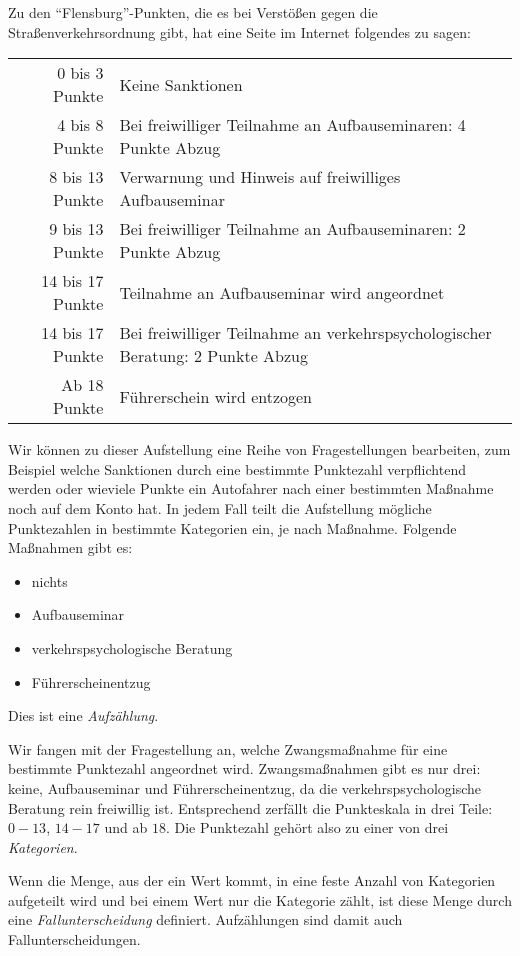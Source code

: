 Zu den "`Flensburg"'-Punkten, die es bei Verstößen gegen die
Straßenverkehrsordnung gibt, hat eine Seite im Internet folgendes zu
sagen:
%
\begin{center}
  \begin{tabular}{rl}
    0 bis 3 Punkte& Keine Sanktionen\\
    4 bis 8 Punkte& Bei freiwilliger Teilnahme an Aufbauseminaren: 4 Punkte Abzug\\
    8 bis 13 Punkte& Verwarnung und Hinweis auf freiwilliges Aufbauseminar\\
    9 bis 13 Punkte& Bei freiwilliger Teilnahme an Aufbauseminaren: 2 Punkte Abzug\\
    14 bis 17 Punkte& Teilnahme an Aufbauseminar wird angeordnet\\
    14 bis 17 Punkte&
                      Bei freiwilliger Teilnahme an verkehrspsychologischer Beratung: 2 Punkte Abzug\\
    Ab 18 Punkte&
                  Führerschein wird entzogen
  \end{tabular}
\end{center}
%
Wir können zu dieser Aufstellung eine Reihe von Fragestellungen
bearbeiten, zum Beispiel welche Sanktionen durch eine bestimmte
Punktezahl verpflichtend werden oder wieviele Punkte ein Autofahrer
nach einer bestimmten Maßnahme noch auf dem Konto hat.  In jedem Fall
teilt die Aufstellung mögliche Punktezahlen in bestimmte Kategorien
ein, je nach Maßnahme.  Folgende Maßnahmen gibt es:
%
\begin{itemize}
\item nichts
\item Aufbauseminar
\item verkehrspsychologische Beratung
\item Führerscheinentzug
\end{itemize}
%
Dies ist eine \textit{Aufzählung}.

Wir fangen mit der Fragestellung an, welche Zwangsmaßnahme für eine
bestimmte Punktezahl angeordnet wird.  Zwangsmaßnahmen gibt es nur
drei: keine, Aufbauseminar und Führerscheinentzug, da die
verkehrspsychologische Beratung rein freiwillig ist.  Entsprechend
zerfällt die Punkteskala in drei Teile: $0-13$, $14-17$ und ab $18$.
Die Punktezahl gehört also zu einer von drei
\textit{Kategorien}.

Wenn die Menge, aus der ein Wert kommt, in eine feste
Anzahl von Kategorien aufgeteilt wird und bei einem Wert nur die
Kategorie zählt, ist diese Menge durch eine \textit{Fallunterscheidung} definiert.
Aufzählungen sind damit auch Fallunterscheidungen.

